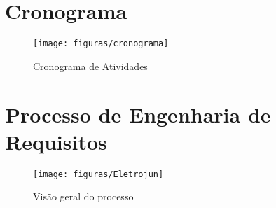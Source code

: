 \begin{apendicesenv}
\partapendices
\chapter{Cronograma}
\label{sec:cronograma}
\FloatBarrier
\begin{figure}[!htpd]
		\centering
		\texttt{[image: figuras/cronograma]}
		\label{img:cronograma}
		\caption{Cronograma de Atividades}
\end{figure}
\chapter{Processo de Engenharia de Requisitos}
\label{sec:processo}
\FloatBarrier
\begin{figure}[!htpd]
		\centering
		\texttt{[image: figuras/Eletrojun]}
		\label{img:processoeletrojun}
		\caption{Visão geral do processo}
\end{figure}
\FloatBarrier
\end{apendicesenv}
